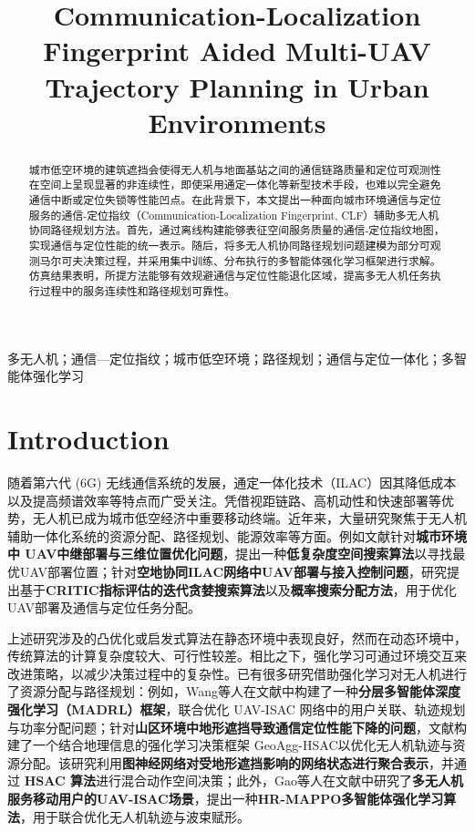 \documentclass[lettersize,journal]{IEEEtran}
\begin{document}
\title{Communication-Localization Fingerprint Aided Multi-UAV Trajectory Planning in Urban Environments}

\author{}

\maketitle

\begin{abstract}
城市低空环境的建筑遮挡会使得无人机与地面基站之间的通信链路质量和定位可观测性在空间上呈现显著的非连续性，即使采用通定一体化等新型技术手段，也难以完全避免通信中断或定位失锁等性能凹点。在此背景下，本文提出一种面向城市环境通信与定位服务的通信-定位指纹（Communication-Localization Fingerprint, CLF）辅助多无人机协同路径规划方法。首先，通过离线构建能够表征空间服务质量的通信-定位指纹地图，实现通信与定位性能的统一表示。随后，将多无人机协同路径规划问题建模为部分可观测马尔可夫决策过程，并采用集中训练、分布执行的多智能体强化学习框架进行求解。仿真结果表明，所提方法能够有效规避通信与定位性能退化区域，提高多无人机任务执行过程中的服务连续性和路径规划可靠性。
\end{abstract}

\begin{IEEEkeywords}
多无人机；通信—定位指纹；城市低空环境；路径规划；通信与定位一体化；多智能体强化学习
\end{IEEEkeywords}

\section{Introduction}

随着第六代 (6G) 无线通信系统的发展，通定一体化技术（ILAC）因其降低成本\cite{ref1}以及提高频谱效率等特点而广受关注。凭借视距链路、高机动性和快速部署等优势\cite{ref2,ref3,ref4,ref5,ref6}，无人机已成为城市低空经济中重要移动终端。近年来，大量研究聚焦于无人机辅助一体化系统的资源分配、路径规划、能源效率等方面。例如文献\cite{ref7}针对\textbf{城市环境中 UAV中继部署与三维位置优化问题}，提出一种\textbf{低复杂度空间搜索算法}以寻找最优UAV部署位置；针对\textbf{空地协同ILAC网络中UAV部署与接入控制问题}，研究\cite{ref8}提出基于\textbf{CRITIC指标评估的迭代贪婪搜索算法}以及\textbf{概率搜索分配方法}，用于优化UAV部署及通信与定位任务分配。

上述研究涉及的凸优化或启发式算法在静态环境中表现良好，然而在动态环境中，传统算法的计算复杂度较大、可行性较差\cite{ref9}。相比之下，强化学习可通过环境交互来改进策略，以减少决策过程中的复杂性\cite{ref10}。已有很多研究借助强化学习对无人机进行了资源分配与路径规划：例如，Wang等人在文献\cite{ref9}中构建了一种\textbf{分层多智能体深度强化学习（MADRL）框架}，联合优化 UAV-ISAC 网络中的用户关联、轨迹规划与功率分配问题；针对\textbf{山区环境中地形遮挡导致通信定位性能下降的问题}，文献\cite{ref11}构建了一个结合地理信息的强化学习决策框架 GeoAgg-HSAC以优化无人机轨迹与资源分配。该研究利用\textbf{图神经网络对受地形遮挡影响的网络状态进行聚合表示}，并通过 \textbf{HSAC 算法}进行混合动作空间决策；此外，Gao等人在文献\cite{ref12}中研究了\textbf{多无人机服务移动用户的UAV-ISAC场景}，提出一种\textbf{HR-MAPPO多智能体强化学习算法}，用于联合优化无人机轨迹与波束赋形。
\end{document}
